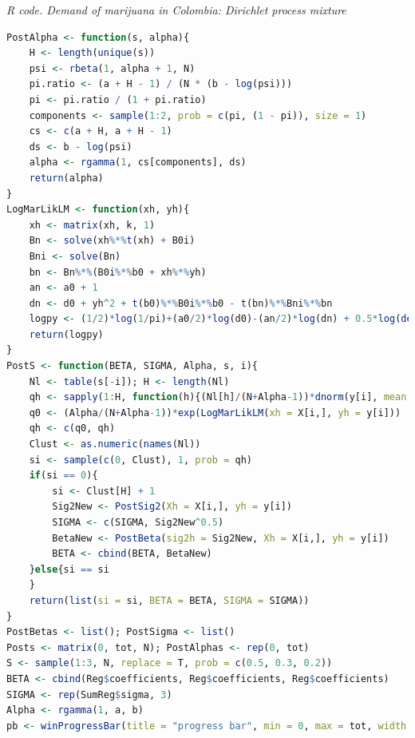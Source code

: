 \begin{tcolorbox}[enhanced,width=4.67in,center upper,
	fontupper=\large\bfseries,drop shadow southwest,sharp corners]
	\textit{R code. Demand of marijuana in Colombia: Dirichlet process mixture}
	\begin{VF}
		\begin{lstlisting}[language=R]
PostAlpha <- function(s, alpha){
	H <- length(unique(s))
	psi <- rbeta(1, alpha + 1, N)
	pi.ratio <- (a + H - 1) / (N * (b - log(psi)))
	pi <- pi.ratio / (1 + pi.ratio)
	components <- sample(1:2, prob = c(pi, (1 - pi)), size = 1)
	cs <- c(a + H, a + H - 1)
	ds <- b - log(psi)
	alpha <- rgamma(1, cs[components], ds)
	return(alpha)
}
LogMarLikLM <- function(xh, yh){
	xh <- matrix(xh, k, 1)
	Bn <- solve(xh%*%t(xh) + B0i)
	Bni <- solve(Bn)
	bn <- Bn%*%(B0i%*%b0 + xh%*%yh)
	an <- a0 + 1
	dn <- d0 + yh^2 + t(b0)%*%B0i%*%b0 - t(bn)%*%Bni%*%bn 
	logpy <- (1/2)*log(1/pi)+(a0/2)*log(d0)-(an/2)*log(dn) + 0.5*log(det(Bn)/det(B0)) + lgamma(an/2)-lgamma(a0/2)
	return(logpy)
}
PostS <- function(BETA, SIGMA, Alpha, s, i){
	Nl <- table(s[-i]); H <- length(Nl)
	qh <- sapply(1:H, function(h){(Nl[h]/(N+Alpha-1))*dnorm(y[i], mean = t(X[i,])%*%BETA[,h], sd = SIGMA[h])})
	q0 <- (Alpha/(N+Alpha-1))*exp(LogMarLikLM(xh = X[i,], yh = y[i]))
	qh <- c(q0, qh)
	Clust <- as.numeric(names(Nl))
	si <- sample(c(0, Clust), 1, prob = qh)
	if(si == 0){
		si <- Clust[H] + 1
		Sig2New <- PostSig2(Xh = X[i,], yh = y[i])
		SIGMA <- c(SIGMA, Sig2New^0.5)
		BetaNew <- PostBeta(sig2h = Sig2New, Xh = X[i,], yh = y[i])
		BETA <- cbind(BETA, BetaNew)
	}else{si == si
	}
	return(list(si = si, BETA = BETA, SIGMA = SIGMA))
}
PostBetas <- list(); PostSigma <- list()
Posts <- matrix(0, tot, N); PostAlphas <- rep(0, tot)
S <- sample(1:3, N, replace = T, prob = c(0.5, 0.3, 0.2))
BETA <- cbind(Reg$coefficients, Reg$coefficients, Reg$coefficients)
SIGMA <- rep(SumReg$sigma, 3)
Alpha <- rgamma(1, a, b)
pb <- winProgressBar(title = "progress bar", min = 0, max = tot, width = 300)
\end{lstlisting}
	\end{VF}
\end{tcolorbox}

